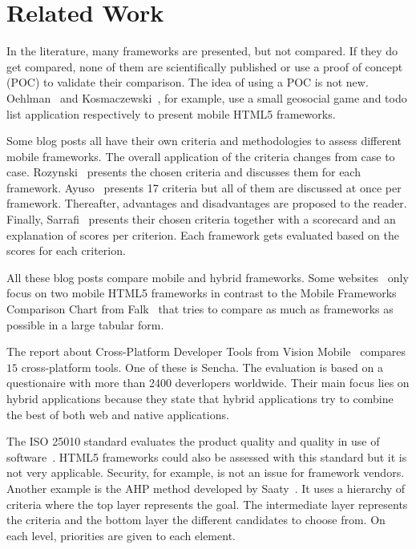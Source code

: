 \documentclass[a4paper]{artikel3}
\begin{document}
\section{Related Work} %
\label{sec:related-work}

In the literature, many frameworks are presented, but not compared.
If they do get compared, none of them are scientifically published or use a proof of concept (POC) to validate their comparison.  
The idea of using a POC is not new.  
Oehlman~\cite{Oeflman2011} and Kosmaczewski~\cite{Kosmaczewski2012},  for example,  use a small geosocial game and todo list application respectively to present mobile HTML5 frameworks.

Some blog posts \cite{Sarrafi2012a,Ayuso2012,Rozynski2011} all have their own criteria and methodologies to assess different mobile frameworks.  
The overall application of the criteria changes from case to case.  
Rozynski~\cite{Rozynski2011} presents the chosen criteria and discusses them for each framework.  
Ayuso~\cite{Ayuso2012} presents 17 criteria but all of them are discussed at once per framework.  
Thereafter,  advantages and disadvantages are proposed to the reader.  
Finally, Sarrafi~\cite{Sarrafi2012a} presents their chosen criteria together with a scorecard and an explanation of scores per criterion.  
Each framework gets evaluated based on the scores for each criterion.

All these blog posts compare mobile and hybrid frameworks.  
Some websites~\cite{Bristowe2012,Burris} only focus on two mobile HTML5 frameworks in contrast to the Mobile Frameworks Comparison Chart from Falk~\cite{Falk2011} that tries to compare as much as frameworks as possible in a large tabular form.

The report about Cross-Platform Developer Tools from Vision Mobile~\cite{Mobile2012} compares $15$ cross-platform tools.
One of these is Sencha.
The evaluation is based on a questionaire with more than 2400 deverlopers worldwide.
Their main focus lies on hybrid applications because they state that hybrid applications try to combine the best of both web and native applications.

The ISO 25010 standard evaluates the product quality and quality in use of software~\cite{Standard2010}.
HTML5 frameworks could also be assessed with this standard but it is not very applicable.
Security,  for example,  is not an issue for framework vendors.
Another example is the AHP method developed by Saaty~\cite{Jadhav2009}.
It uses a hierarchy of criteria where the top layer represents the goal.
The intermediate layer represents the criteria and the bottom layer the different candidates to choose from.
On each level, priorities are given to each element.
\end{document}
